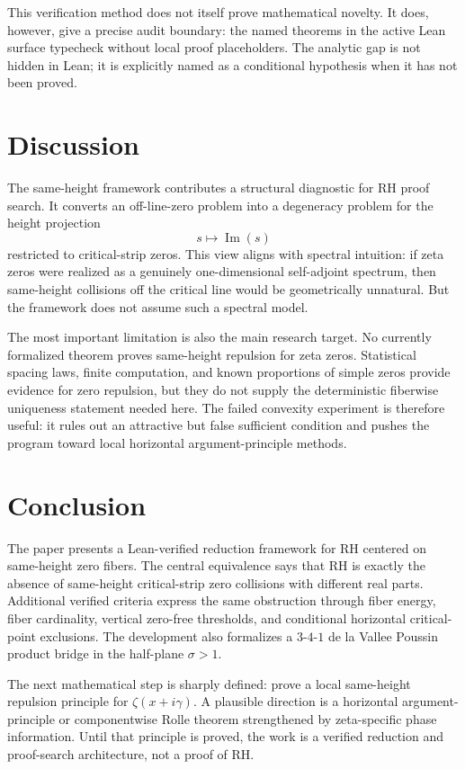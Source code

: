 \documentclass[11pt]{amsart}
\newcommand{\zetaR}{\zeta}
\newcommand{\im}{\operatorname{Im}}
\begin{document}
This verification method does not itself prove mathematical novelty.  It does,
however, give a precise audit boundary: the named theorems in the active Lean
surface typecheck without local proof placeholders.  The analytic gap is not
hidden in Lean; it is explicitly named as a conditional hypothesis when it has
not been proved.

\section{Discussion}

The same-height framework contributes a structural diagnostic for RH proof
search.  It converts an off-line-zero problem into a degeneracy problem for the
height projection
\[
  s\mapsto \im(s)
\]
restricted to critical-strip zeros.  This view aligns with spectral intuition:
if zeta zeros were realized as a genuinely one-dimensional self-adjoint
spectrum, then same-height collisions off the critical line would be
geometrically unnatural.  But the framework does not assume such a spectral
model.

The most important limitation is also the main research target.  No currently
formalized theorem proves same-height repulsion for zeta zeros.  Statistical
spacing laws, finite computation, and known proportions of simple zeros provide
evidence for zero repulsion, but they do not supply the deterministic
fiberwise uniqueness statement needed here.  The failed convexity experiment is
therefore useful: it rules out an attractive but false sufficient condition and
pushes the program toward local horizontal argument-principle methods.

\section{Conclusion}

The paper presents a Lean-verified reduction framework for RH centered on
same-height zero fibers.  The central equivalence says that RH is exactly the
absence of same-height critical-strip zero collisions with different real
parts.  Additional verified criteria express the same obstruction through
fiber energy, fiber cardinality, vertical zero-free thresholds, and conditional
horizontal critical-point exclusions.  The development also formalizes a
\(3\)-\(4\)-\(1\) de la Vallee Poussin product bridge in the half-plane
\(\sigma>1\).

The next mathematical step is sharply defined: prove a local same-height
repulsion principle for \(\zetaR(x+i\gamma)\).  A plausible direction is a
horizontal argument-principle or componentwise Rolle theorem strengthened by
zeta-specific phase information.  Until that principle is proved, the work is a
verified reduction and proof-search architecture, not a proof of RH.
\end{document}
